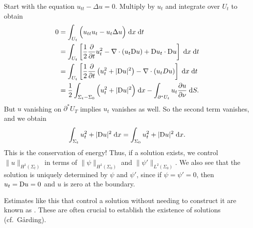 \documentclass[a4paper]{article}
\begin{document}
\begin{eg}
  Start with the equation $u_{tt} - \Delta u = 0$. Multiply by $u_t$ and integrate over $U_t$ to obtain
  \begin{align*}
    0 &= \int_{U_t} \Big(u_{tt} u_t - u_t \Delta u\Big) \;\mathrm{d} x\;\mathrm{d} t\\
    &= \int_{U_t} \left[\frac{1}{2}\frac{\partial}{\partial t} u_t^2 - \nabla \cdot (u_t \mathrm{D} u) + \mathrm{D} u_t \cdot \mathrm{D} u\right]\;\mathrm{d} x\;\mathrm{d} t\\
    &= \int_{U_t} \left[\frac{1}{2}\frac{\partial}{\partial t} \left( u_t^2 + |\mathrm{D} u|^2\right) - \nabla \cdot (u_t D u)\right]\;\mathrm{d} x\;\mathrm{d} t\\
    &= \frac{1}{2} \int_{\Sigma_t - \Sigma_0} \Big(u_t^2 + |\mathrm{D} u|^2\Big)\;\mathrm{d} x - \int_{\partial^* U_t} u_t \frac{\partial u}{\partial \nu}\;\mathrm{d} S.
  \end{align*}
  But $u$ vanishing on $\partial^* U_T$ implies $u_t$ vanishes as well. So the second term vanishes, and we obtain
  \[
    \int_{\Sigma_t} u_t^2 + |\mathrm{D} u|^2 \;\mathrm{d} x = \int_{\Sigma_0} u_t^2 + |\mathrm{D} u|^2 \;\mathrm{d} x.
  \]
  This is the conservation of energy! Thus, if a solution exists, we control $\|u\|_{H^1(\Sigma_t)}$ in terms of $\|\psi\|_{H^1(\Sigma_0)}$ and $\|\psi'\|_{L^2(\Sigma_0)}$. We also see that the solution is uniquely determined by $\psi$ and $\psi'$, since if $\psi = \psi' = 0$, then $u_t = \mathrm{D} u = 0$ and $u$ is zero at the boundary.
\end{eg}

Estimates like this that control a solution without needing to construct it are known as . These are often crucial to establish the existence of solutions (cf.\ G\r{a}rding).

\end{document}
